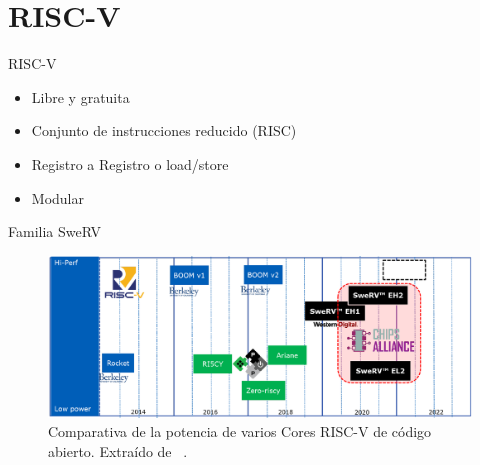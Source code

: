 \section{RISC-V}

\begin{frame}{RISC-V}
    \begin{itemize}
        \item Libre y gratuita
        \item Conjunto de instrucciones reducido (RISC)
        \item Registro a Registro o load/store
        \item Modular
    \end{itemize}
    
    \nocite{RiscVSpec1}
    \nocite{RiscVExchangeCores}
\end{frame}

\begin{frame}{Familia SweRV}
    \begin{figure}
        \centering
        \includegraphics[width=.7\linewidth]{Images/roadmap_compare2.png}
        \caption{Comparativa de la potencia de varios Cores RISC-V de código abierto. Extraído de ~\cite{SweRVRoadmap}.}
        \label{fig:roadmap_compare}
    \end{figure}
    
    \nocite{RepoSwervEL2}
\end{frame}

